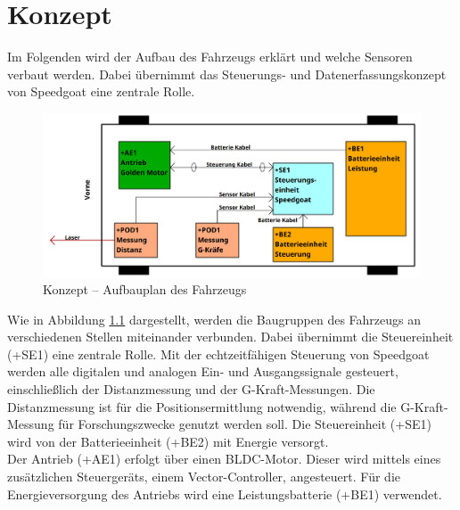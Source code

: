 \chapter{Konzept}
\label{chapter:Konzept}


Im Folgenden wird der Aufbau des Fahrzeugs erklärt und welche Sensoren verbaut werden. Dabei übernimmt das Steuerungs- und Datenerfassungskonzept von Speedgoat eine zentrale Rolle.\\
\pagebreak[1]
\begin{figure}[!ht]
	\begin{center}
		\includegraphics[width=.95\textwidth]{img/3_schaltplan/sp_aufbauplan_0.png}
		\caption{Konzept – Aufbauplan des Fahrzeugs}
		\label{img_1_1:Konzept:0}
	\end{center}
\end{figure}
\pagebreak[1]
Wie in Abbildung \ref{img_1_1:Konzept:0} dargestellt, werden die Baugruppen des Fahrzeugs an verschiedenen Stellen miteinander verbunden. Dabei übernimmt die Steuereinheit (+SE1) eine zentrale Rolle. Mit der echtzeitfähigen Steuerung von Speedgoat werden alle digitalen und analogen Ein- und Ausgangssignale gesteuert, einschließlich der Distanzmessung und der G-Kraft-Messungen. Die Distanzmessung ist für die Positionsermittlung notwendig, während die G-Kraft-Messung für Forschungszwecke genutzt werden soll. Die Steuereinheit (+SE1) wird von der Batterieeinheit (+BE2) mit Energie versorgt.\\
Der Antrieb (+AE1) erfolgt über einen BLDC-Motor. Dieser wird mittels eines zusätzlichen Steuergeräts, einem Vector-Controller, angesteuert. Für die Energieversorgung des Antriebs wird eine Leistungsbatterie (+BE1) verwendet.

